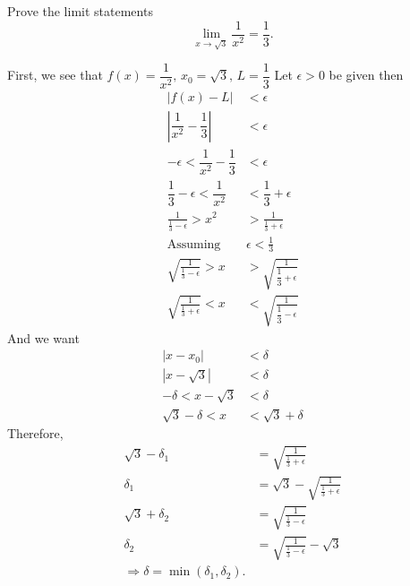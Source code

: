 \documentclass{hwset}
\begin{document}
\begin{problem}
	Prove the limit statements
	\begin{equation*}
		\lim_{x\to \sqrt{3}} \frac{1}{x^2} = \frac{1}{3}.
	\end{equation*}
\end{problem}

\begin{solution}
	First, we see that $f(x) = \dfrac{1}{x^2},\, x_0=\sqrt{3},\, L=\dfrac{1}{3}$
	Let $\epsilon >0$ be given then
	\begin{align*}
		\left|f(x) - L\right| &< \epsilon \\
		\left|\dfrac{1}{x^2} - \dfrac{1}{3}\right| &< \epsilon \\
		-\epsilon < \dfrac{1}{x^2} - \dfrac{1}{3} &< \epsilon \\
		\dfrac{1}{3} - \epsilon < \dfrac{1}{x^2} &< \dfrac{1}{3} + \epsilon \\
		\frac{1}{\frac{1}{3} - \epsilon} > x^2 &> \frac{1}{\frac{1}{3} + \epsilon} \\
		\text{Assuming }& \epsilon < \frac{1}{3} \\
		\sqrt{\frac{1}{\frac{1}{3} - \epsilon}} > x &> \sqrt{\frac{1}{\dfrac{1}{3} +
			\epsilon}} \\
		\sqrt{\frac{1}{\frac{1}{3} + \epsilon}} < x &< \sqrt{\frac{1}{\dfrac{1}{3} -
			\epsilon}}
	\end{align*}
	And we want 
	\begin{align*}
		|x - x_0| &< \delta \\
		|x - \sqrt{3}| &< \delta \\
		-\delta < x - \sqrt{3} &< \delta \\
		\sqrt{3} - \delta < x &< \sqrt{3} + \delta
	\end{align*}
	Therefore,
	\begin{align*}
		\sqrt{3} - \delta_1 &= \sqrt{\frac{1}{\frac{1}{3} + \epsilon}} \\
		\delta_1 &= \sqrt{3}  - \sqrt{\frac{1}{\frac{1}{3} + \epsilon}} \\
		\sqrt{3} + \delta_2 &= \sqrt{\frac{1}{\frac{1}{3} - \epsilon}} \\
		\delta_2 &= \sqrt{\frac{1}{\frac{1}{3} - \epsilon}} - \sqrt{3} \\
		\Rightarrow \delta = \min(\delta_1,\delta_2).
	\end{align*}
\end{solution}
\end{document}
